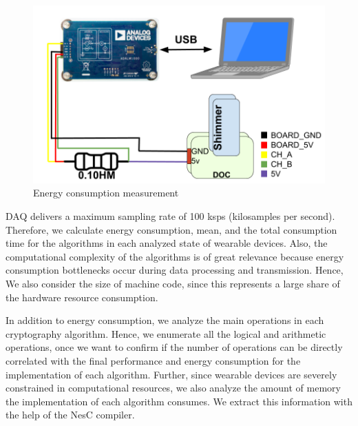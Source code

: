 \begin{figure}[!htb]
 \vspace{-0.1cm}
  \centering
  \includegraphics[scale=0.19]{Figures/circuit.png}
  \caption{Energy consumption measurement}
  \label{fig:circuit}
\end{figure}

DAQ delivers a maximum sampling rate of 100 ksps (kilosamples per second).
 Therefore, we 
calculate energy consumption, mean, and the total consumption time for the algorithms in each analyzed state of wearable devices. Also, the computational complexity of the algorithms is of great relevance because energy consumption bottlenecks occur during data processing and transmission. Hence,  We also consider 
the size of machine code, since this represents a large share of the hardware resource consumption.


In addition to energy consumption, we analyze the main operations in each cryptography algorithm.
Hence, we
enumerate all the logical and arithmetic operations, once we want to confirm if the number of operations can be directly correlated with the final performance and energy consumption for the implementation of each algorithm.
Further, since wearable devices are severely constrained in computational resources, we also analyze the amount of memory the implementation of each algorithm consumes. We extract this information with the help of the NesC compiler.

